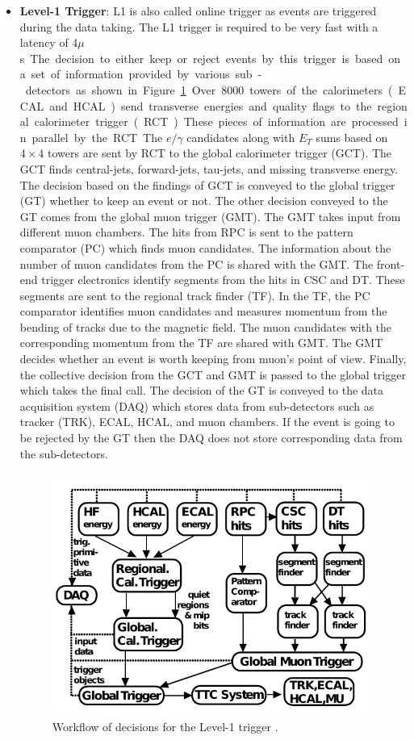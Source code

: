 \begin{itemize} [leftmargin=*]
\item \textbf{Level-1 Trigger}: L1 is also called online trigger as 
events are triggered during the data taking. The L1 trigger is 
required to be very fast with a latency of 4\unit{$\mu$s}. The decision to either 
keep or reject events by this trigger is based on a set of information 
provided by various sub-detectors as shown in Figure~\ref{fig:L1Trig}.
Over 8000 towers of the calorimeters (ECAL and HCAL) send transverse energies
and quality flags to the regional calorimeter trigger (RCT). These pieces of
information are processed in parallel by the RCT. The $e/\gamma$ candidates along 
with $E_{T}$ sums based on $4\times 4$ towers are sent by RCT to the global calorimeter
trigger (GCT). The GCT finds central-jets, forward-jets, tau-jets, and missing transverse energy.
The decision based on the findings of GCT is conveyed to the global trigger (GT) 
whether to keep an event or not. The other decision conveyed to the GT comes 
from the global muon trigger (GMT). The GMT takes input from different muon chambers.
The hits from RPC is sent to the pattern comparator (PC) which finds muon 
candidates. The information about the number of muon candidates from the PC is 
shared with the GMT. The front-end trigger electronics identify segments from 
the hits in CSC and DT. These segments are sent to the regional track finder (TF).
In the TF, the PC comparator identifies muon candidates and measures momentum 
from the bending of tracks due to the magnetic field. The muon candidates with the
corresponding momentum from the TF are shared with GMT. The GMT decides whether
an event is worth keeping from muon's point of view. Finally, the collective
decision from the GCT and GMT is passed to the global trigger which takes
the final call. The decision of the GT is conveyed to the data acquisition system 
(DAQ) which stores data from sub-detectors such as tracker (TRK), ECAL, HCAL, and muon 
chambers. If the event is going to be rejected by the GT then the DAQ does not 
store corresponding data from the sub-detectors.
\begin{figure}
  \begin{center}
  \includegraphics[width=0.70\linewidth]{Experiment/CMS/Image/L1Trig.pdf}
  \caption{Workflow of decisions for the Level-1 trigger \cite{Khachatryan:2016bia}.}
  \label{fig:L1Trig}
  \end{center}
\end{figure}


\end{itemize}
